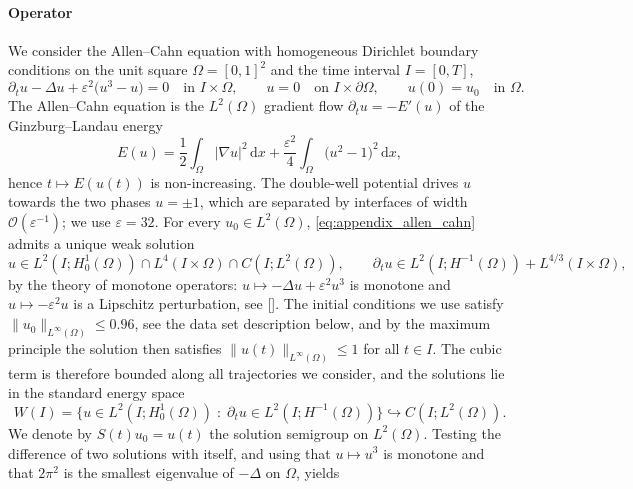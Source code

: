 \documentclass{article} %
\begin{document}
\paragraph{Operator} We consider the Allen--Cahn equation with homogeneous Dirichlet boundary conditions on the unit square $\Omega = [0,1]^2$ and the time interval $I = [0,T]$,
\begin{equation}\label{eq:appendix_allen_cahn}
   \partial_t u - \Delta u + \varepsilon^2\big(u^3 - u\big) = 0 \quad \text{in } I\times\Omega,
   \qquad
   u = 0 \quad \text{on } I\times\partial\Omega,
   \qquad
   u(0) = u_0 \quad \text{in } \Omega.
\end{equation}
The Allen--Cahn equation is the $L^2(\Omega)$ gradient flow $\partial_t u = -E'(u)$ of the Ginzburg--Landau energy
\begin{equation}\label{eq:appendix_ginzburg_landau}
   E(u) = \frac12\int_\Omega |\nabla u|^2\,\mathrm dx + \frac{\varepsilon^2}{4}\int_\Omega \big(u^2 - 1\big)^2\,\mathrm dx,
\end{equation}
hence $t\mapsto E(u(t))$ is non-increasing. The double-well potential drives $u$ towards the two phases $u = \pm 1$, which are separated by interfaces of width $\mathcal O(\varepsilon^{-1})$; we use $\varepsilon = 32$. For every $u_0\in L^2(\Omega)$, \eqref{eq:appendix_allen_cahn} admits a unique weak solution
\begin{equation*}
   u \in L^2(I;H^1_0(\Omega)) \cap L^4(I\times\Omega) \cap C(I;L^2(\Omega)),
   \qquad
   \partial_t u \in L^2(I;H^{-1}(\Omega)) + L^{4/3}(I\times\Omega),
\end{equation*}
by the theory of monotone operators: $u\mapsto -\Delta u + \varepsilon^2 u^3$ is monotone and $u\mapsto -\varepsilon^2 u$ is a Lipschitz perturbation, see []. The initial conditions we use satisfy $\|u_0\|_{L^\infty(\Omega)} \leq 0.96$, see the data set description below, and by the maximum principle the solution then satisfies $\|u(t)\|_{L^\infty(\Omega)}\leq 1$ for all $t\in I$. The cubic term is therefore bounded along all trajectories we consider, and the solutions lie in the standard energy space
\begin{equation*}
   W(I) = \big\{ u\in L^2(I;H^1_0(\Omega)) \;:\; \partial_t u \in L^2(I;H^{-1}(\Omega)) \big\} \hookrightarrow C(I;L^2(\Omega)).
\end{equation*}
We denote by $S(t)u_0 = u(t)$ the solution semigroup on $L^2(\Omega)$. Testing the difference of two solutions with itself, and using that $u\mapsto u^3$ is monotone and that $2\pi^2$ is the smallest eigenvalue of $-\Delta$ on $\Omega$, yields
\end{document}
